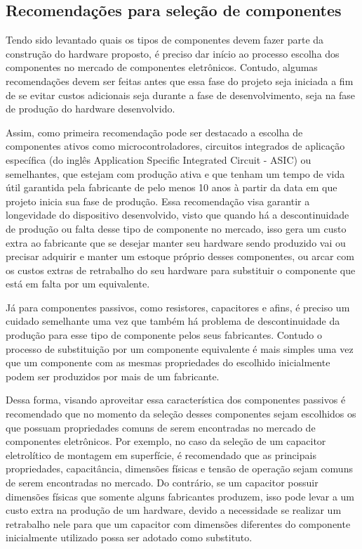 
\subsection{Recomendações para seleção de componentes}\label{subsec:recomendacoes_componentes}

Tendo sido levantado quais os tipos de componentes devem fazer parte da construção do hardware proposto, é preciso dar início ao processo escolha dos componentes no mercado de componentes eletrônicos. Contudo, algumas recomendações devem ser feitas antes que essa fase do projeto seja iniciada a fim de se evitar custos adicionais seja durante a fase de desenvolvimento, seja na fase de produção do hardware desenvolvido. 

Assim, como primeira recomendação pode ser destacado a escolha de componentes ativos como microcontroladores,  circuitos integrados de aplicação específica (do inglês Application Specific Integrated Circuit - ASIC) ou semelhantes, que estejam com produção ativa e que tenham um tempo de vida útil garantida pela fabricante de pelo menos 10 anos à partir da data em que projeto inicia sua fase de produção. Essa recomendação visa garantir a longevidade do dispositivo desenvolvido, visto que quando há a descontinuidade de produção ou falta desse tipo de componente no mercado, isso gera um custo extra ao fabricante que se desejar manter seu hardware sendo produzido vai ou precisar adquirir e manter um estoque próprio desses componentes, ou arcar com os custos extras de retrabalho do seu hardware para substituir o componente que está em falta por um equivalente. 

Já para componentes passivos, como resistores, capacitores e afins, é preciso um cuidado semelhante uma vez que também há problema de descontinuidade da produção para esse tipo de componente pelos seus fabricantes. Contudo o processo de substituição por um componente equivalente é mais simples uma vez que um componente com as mesmas propriedades do escolhido inicialmente podem ser produzidos por mais de um fabricante. 

Dessa forma, visando aproveitar essa característica dos componentes passivos é recomendado que no momento da seleção desses componentes sejam escolhidos os que possuam propriedades comuns de serem encontradas no mercado de componentes eletrônicos. Por exemplo, no caso da seleção de um capacitor eletrolítico de montagem em superfície, é recomendado que as principais propriedades, capacitância, dimensões físicas e tensão de operação sejam comuns de serem encontradas no mercado. Do contrário, se um capacitor possuir dimensões físicas que somente alguns fabricantes produzem, isso pode levar a um custo extra na produção de um hardware, devido a necessidade se realizar um retrabalho nele para que um capacitor com dimensões diferentes do componente inicialmente utilizado possa ser adotado como substituto. 

